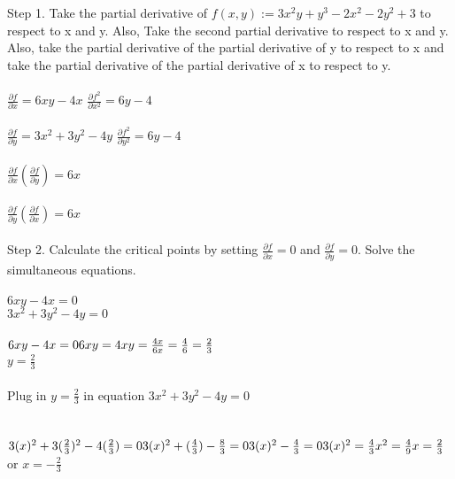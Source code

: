 \documentclass{article}
\begin{document}
\begin{enumerate}[14.]
	Step 1. Take the partial derivative of $f(x,y) := 3x^{2}y+y^{3}-2x^{2}-2y^{2}+3$ to respect to x and y. Also, Take the second partial derivative to respect to x and y. Also, take the partial derivative of the partial derivative of y to respect to x and take the partial derivative of the partial derivative of x to respect to y.
	\\
	\\
	$\frac{\partial{f}}{\partial{x}}=6xy-4x$          \hspace{2.9cm}$\frac{\partial{f^{2}}}{\partial{x^{2}}}=6y-4$\\
	\\
	$\frac{\partial{f}}{\partial{y}}=3x^{2}+3y^{2}-4y$ \hspace{2cm}$\frac{\partial{f^{2}}}{\partial{y^{2}}}=6y-4$\\
	\\
	$\frac{\partial{f}}{\partial{x}}(\frac{\partial{f}}{\partial{y}})=6x$\\
	\\
	$\frac{\partial{f}}{\partial{y}}(\frac{\partial{f}}{\partial{x}})=6x$ \\
	\\
	Step 2. Calculate the critical points by setting $\frac{\partial{f}}{\partial{x}}=0$ and $\frac{\partial{f}}{\partial{y}}=0$. Solve the simultaneous equations.\\
	\\
	$6xy-4x=0$\\
	$3x^{2}+3y^{2}-4y=0$
	\\
	\\
	$6xy-4x=0\\6xy=4x\\y=\frac{4x}{6x}=\frac{4}{6}=\frac{2}{3}$\\
	$y=\frac{2}{3}$\\
	\\
	Plug in $y=\frac{2}{3}$ in equation $3x^{2}+3y^{2}-4y=0$\\
	\\
	\\$ 3(x)^{2}+3(\frac{2}{3})^{2}-4(\frac{2}{3})=0 \\ 3(x)^{2}+(\frac{4}{3})-\frac{8}{3}=0\\ \\ 3(x)^{2}-\frac{4}{3}=0 \\ 3(x)^{2}=\frac{4}{3} \\ x^{2}=\frac{4}{9} \\ \\ x=\frac{2}{3}$ or $x=-\frac{2}{3}$ \\

\end{enumerate}
\end{document}
